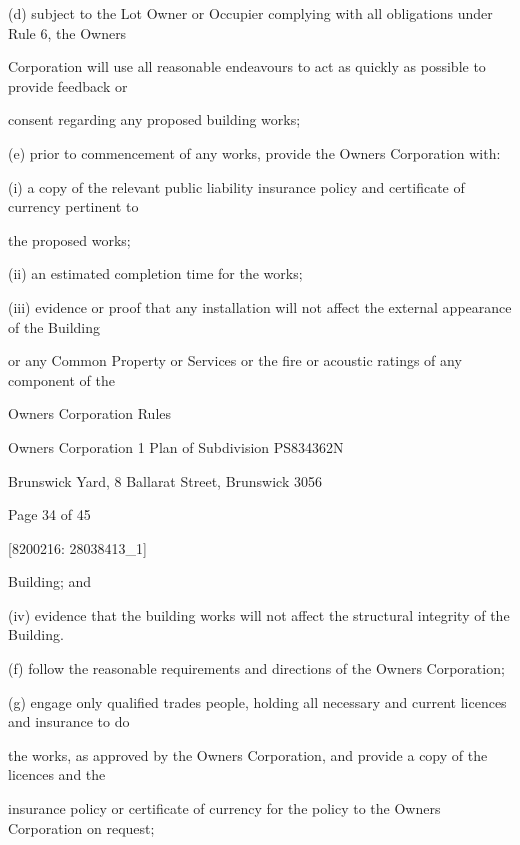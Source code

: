 \documentclass{article}
\begin{document}
{\fontsize{9.962}{1}(d) subject to the Lot Owner or Occupier complying with all obligations under Rule 6, the Owners }

{\fontsize{10.02}{1}Corporation will use all reasonable endeavours to act as quickly as possible to provide feedback or }

{\fontsize{10.02}{1}consent regarding any proposed building works; }

{\fontsize{9.962}{1}(e) prior to commencement of any works, provide the Owners Corporation with: }

{\fontsize{9.962}{1}(i) a copy of the relevant public liability insurance policy and certificate of currency pertinent to }

{\fontsize{10.02}{1}the proposed works; }

{\fontsize{9.962}{1}(ii) an estimated completion time for the works; }

{\fontsize{9.962}{1}(iii) evidence or proof that any installation will not affect the external appearance of the Building }

{\fontsize{10.02}{1}or any Common Property or Services or the fire or acoustic ratings of any component of the }

\newpage





{\fontsize{9}{1}Owners Corporation Rules }

{\fontsize{9}{1}Owners Corporation 1 Plan of Subdivision PS834362N }

{\fontsize{9}{1}Brunswick Yard, 8 Ballarat Street, Brunswick 3056 }


{\fontsize{9}{1}Page 34  of 45 }



{\fontsize{7.02}{1}[8200216: 28038413\_1] }

{\fontsize{10.02}{1}Building; and }

{\fontsize{9.962}{1}(iv) evidence that the building works will not affect the structural integrity of the Building. }

{\fontsize{9.962}{1}(f) follow the reasonable requirements and directions of the Owners Corporation; }

{\fontsize{9.962}{1}(g) engage only qualified trades people, holding all necessary and current licences and insurance to do }

{\fontsize{10.02}{1}the works, as approved by the Owners Corporation, and provide a copy of the licences and the }

{\fontsize{10.02}{1}insurance policy or certificate of currency for the policy to the Owners Corporation on request; }
\end{document}
